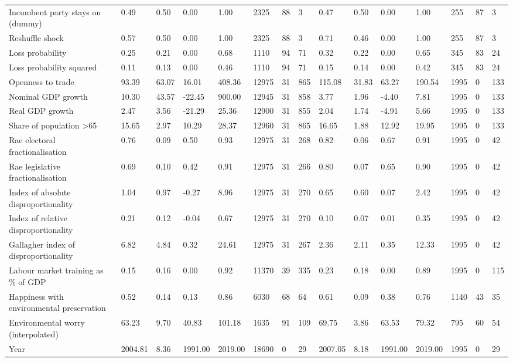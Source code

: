 \begin{longtable}{lllllllllllllll}
Incumbent party stays on (dummy) & 0.49 & 0.50 & 0.00 & 1.00 & 2325 & 88 & 3 & 0.47 & 0.50 & 0.00 & 1.00 & 255 & 87 & 3\\
Reshuffle shock & 0.57 & 0.50 & 0.00 & 1.00 & 2325 & 88 & 3 & 0.71 & 0.46 & 0.00 & 1.00 & 255 & 87 & 3\\
Loss probability & 0.25 & 0.21 & 0.00 & 0.68 & 1110 & 94 & 71 & 0.32 & 0.22 & 0.00 & 0.65 & 345 & 83 & 24\\
\addlinespace
Loss probability squared & 0.11 & 0.13 & 0.00 & 0.46 & 1110 & 94 & 71 & 0.15 & 0.14 & 0.00 & 0.42 & 345 & 83 & 24\\
Openness to trade & 93.39 & 63.07 & 16.01 & 408.36 & 12975 & 31 & 865 & 115.08 & 31.83 & 63.27 & 190.54 & 1995 & 0 & 133\\
Nominal GDP growth & 10.30 & 43.57 & -22.45 & 900.00 & 12945 & 31 & 858 & 3.77 & 1.96 & -4.40 & 7.81 & 1995 & 0 & 133\\
Real GDP growth & 2.47 & 3.56 & -21.29 & 25.36 & 12900 & 31 & 855 & 2.04 & 1.74 & -4.91 & 5.66 & 1995 & 0 & 133\\
Share of population >65 & 15.65 & 2.97 & 10.29 & 28.37 & 12960 & 31 & 865 & 16.65 & 1.88 & 12.92 & 19.95 & 1995 & 0 & 133\\
\addlinespace
Rae electoral fractionalisation & 0.76 & 0.09 & 0.50 & 0.93 & 12975 & 31 & 268 & 0.82 & 0.06 & 0.67 & 0.91 & 1995 & 0 & 42\\
Rae legislative fractionalisation & 0.69 & 0.10 & 0.42 & 0.91 & 12975 & 31 & 266 & 0.80 & 0.07 & 0.65 & 0.90 & 1995 & 0 & 42\\
Index of absolute disproportionality & 1.04 & 0.97 & -0.27 & 8.96 & 12975 & 31 & 270 & 0.65 & 0.60 & 0.07 & 2.42 & 1995 & 0 & 42\\
Index of relative disproportionality & 0.21 & 0.12 & -0.04 & 0.67 & 12975 & 31 & 270 & 0.10 & 0.07 & 0.01 & 0.35 & 1995 & 0 & 42\\
Gallagher index of disproportionality & 6.82 & 4.84 & 0.32 & 24.61 & 12975 & 31 & 267 & 2.36 & 2.11 & 0.35 & 12.33 & 1995 & 0 & 42\\
\addlinespace
Labour market training as \% of GDP & 0.15 & 0.16 & 0.00 & 0.92 & 11370 & 39 & 335 & 0.23 & 0.18 & 0.00 & 0.89 & 1995 & 0 & 115\\
Happiness with environmental preservation & 0.52 & 0.14 & 0.13 & 0.86 & 6030 & 68 & 64 & 0.61 & 0.09 & 0.38 & 0.76 & 1140 & 43 & 35\\
Environmental worry (interpolated) & 63.23 & 9.70 & 40.83 & 101.18 & 1635 & 91 & 109 & 69.75 & 3.86 & 63.53 & 79.32 & 795 & 60 & 54\\
Year & 2004.81 & 8.36 & 1991.00 & 2019.00 & 18690 & 0 & 29 & 2007.05 & 8.18 & 1991.00 & 2019.00 & 1995 & 0 & 29\\
\bottomrule
\end{longtable}

